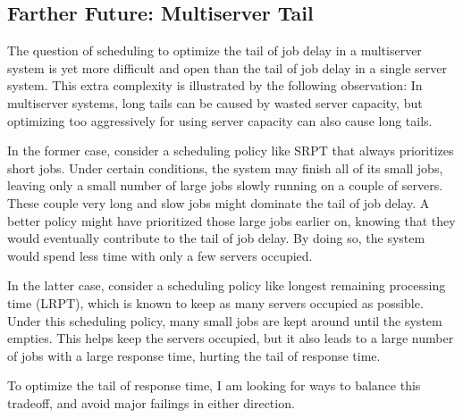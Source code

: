 \documentclass[12pt]{article}
\begin{document}
\subsection{Farther Future: Multiserver Tail}
The question of scheduling to optimize the tail of job delay in a multiserver system is yet more difficult and open than the tail of job delay in a single server system. This extra complexity is illustrated by the following observation: In multiserver systems, long tails can be caused by wasted server capacity, but optimizing too aggressively for using server capacity can also cause long tails.

In the former case, consider a scheduling policy like SRPT that always prioritizes short jobs. Under certain conditions, the system may finish all of its small jobs, leaving only a small number of large jobs slowly running on a couple of servers. These couple very long and slow jobs might dominate the tail of job delay. A better policy might have prioritized those large jobs earlier on, knowing that they would eventually contribute to the tail of job delay. By doing so, the system would spend less time with only a few servers occupied.

In the latter case, consider a scheduling policy like longest remaining processing time (LRPT), which is known to keep as many servers occupied as possible. Under this scheduling policy, many small jobs are kept around until the system empties. This helps keep the servers occupied, but it also leads to a large number of jobs with a large response time, hurting the tail of response time.

To optimize the tail of response time, I am looking for ways to balance this tradeoff, and avoid major failings in either direction.
\end{document}
